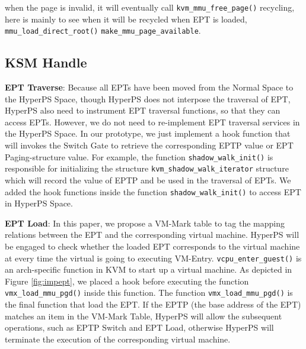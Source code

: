 when the page is invalid, it will eventually call \verb|kvm_mmu_free_page()| recycling, here is mainly to see when it will be recycled
when EPT is loaded, \verb|mmu_load_direct_root()| \verb|make_mmu_page_available|.
\fi

\iffalse

\subsection{KSM Handle}\label{ssub:ksm_handle}

\textbf{EPT Traverse}: 
Because all EPTs have been moved from the Normal Space to the HyperPS Space, though HyperPS does not interpose the traversal of EPT, HyperPS also need to instrument EPT traversal functions, so that they can access EPTs. 
However, we do not need to re-implement EPT traversal services in the HyperPS Space. In our prototype, we just implement a hook function that will invokes the Switch Gate to retrieve the corresponding EPTP value or EPT Paging-structure value. 
For example, the function \verb|shadow_walk_init()| is responsible for initializing the structure \verb|kvm_shadow_walk_iterator| structure which will record the value of EPTP and be used in the traversal of EPTs. We added the hook functions inside the function \verb|shadow_walk_init()| to access EPT in HyperPS Space. 

\textbf{EPT Load}: 
In this paper, we propose a VM-Mark table to tag the mapping relations between the EPT and the corresponding virtual machine. 
HyperPS will be engaged to check whether the loaded EPT corresponds to the virtual machine at every time the virtual is going to executing VM-Entry. 
\verb|vcpu_enter_guest()| is an arch-specific function in KVM to start up a virtual machine. 
As depicted in Figure \ref{fig:impept}, we placed a hook before executing the function \verb|vmx_load_mmu_pgd()| inside this function. The function \verb|vmx_load_mmu_pgd()| is the final function that load the EPT. 
If the EPTP (the base address of the EPT) matches an item in the VM-Mark Table, HyperPS will allow the subsequent operations, such as EPTP Switch and EPT Load, otherwise HyperPS will terminate the execution of the corresponding virtual machine. 

